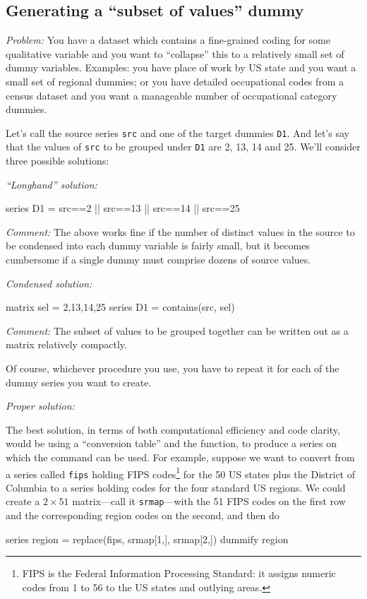 \subsection{Generating a ``subset of values'' dummy}

\emph{Problem:} You have a dataset which contains a fine-grained
coding for some qualitative variable and you want to ``collapse'' this
to a relatively small set of dummy variables. Examples: you have place
of work by US state and you want a small set of regional dummies; or
you have detailed occupational codes from a census dataset and you
want a manageable number of occupational category dummies.

Let's call the source series \texttt{src} and one of the target dummies
\texttt{D1}. And let's say that the values of \texttt{src} to be grouped
under \texttt{D1} are 2, 13, 14 and 25. We'll consider three possible
solutions:

\emph{``Longhand'' solution:}
\begin{code}
series D1 = src==2 || src==13 || src==14 || src==25
\end{code}

\emph{Comment:} The above works fine if the number of distinct values
in the source to be condensed into each dummy variable is fairly
small, but it becomes cumbersome if a single dummy must comprise
dozens of source values.

\emph{Condensed solution:}
\begin{code}
matrix sel = {2,13,14,25}
series D1 = contains(src, sel)
\end{code}

\emph{Comment:} The subset of values to be grouped together can be
written out as a matrix relatively compactly.

Of course, whichever procedure you use, you have to repeat it for each of
the dummy series you want to create.

\emph{Proper solution:}

The best solution, in terms of both computational efficiency and code
clarity, would be using a ``conversion table'' and the 
function, to produce a series on which the  command can
be used. For example, suppose we want to convert from a series called
\texttt{fips} holding FIPS codes\footnote{FIPS is the Federal
  Information Processing Standard: it assigns numeric codes from 1 to
  56 to the US states and outlying areas.} for the 50 US states plus
the District of Columbia to a series holding codes for the four
standard US regions. We could create a $2 \times 51$ matrix---call it
\texttt{srmap}---with the 51 FIPS codes on the first row and the
corresponding region codes on the second, and then do
\begin{code}
series region = replace(fips, srmap[1,], srmap[2,])
dummify region
\end{code}

